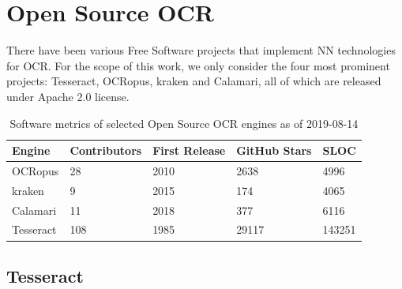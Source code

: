 \documentclass[sigconf]{acmart}
\begin{document}
\section{Open Source OCR}
\label{sec:ooocr}

There have been various Free Software projects that implement NN technologies
for OCR. For the scope of this work, we only consider the four most prominent projects: Tesseract, OCRopus, kraken and Calamari, all of which are released under Apache 2.0 license.


\begin{table}[b]
\caption{Software metrics of selected Open Source OCR engines as of 2019-08-14}
\begin{tabular}{lllll}
\hline
Engine    & Contributors & First Release & GitHub Stars & SLOC \\ \hline
OCRopus   & 28           & 2010          & 2638         & 4996 \\
kraken    & 9            & 2015          & 174          & 4065 \\
Calamari  & 11           & 2018          & 377          & 6116 \\
Tesseract & 108          & 1985          & 29117        & 143251 \\

\end{tabular}
\label{tab:stats}
\end{table}

\subsection{Tesseract}
\end{document}
